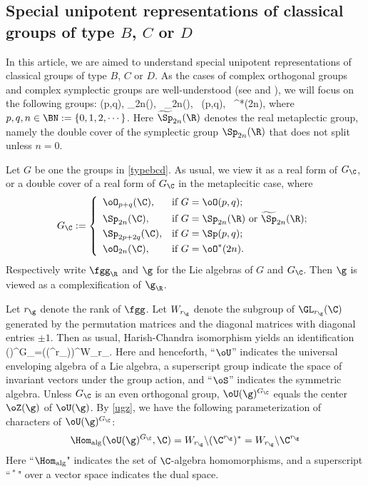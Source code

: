 \documentclass[ssunip.tex]{subfiles}
\begin{document}
\subsection{Special unipotent representations of classical groups of type $B$, $C$ or $D$}\label{secsu}
In this article, we are aimed to understand special unipotent representations of classical groups of type $B$, $C$ or $D$. As the cases of complex orthogonal groups  and complex symplectic groups are well-understood (see
\cite{BVUni} and \cite{B17}), we will focus on the following groups:
\be\label{typebcd}
  \oO(p,q), \Sp_{2n}(\R), \  \widetilde \Sp_{2n}(\R), \ \Sp(p,q), \  \oO^*(2n),
  \ee
  where $p,q, n\in \BN:=\{0,1,2, \cdots\}$. Here $ \widetilde \Sp_{2n}(\R)$ denotes the real metaplectic group, namely the double cover of the symplectic group  $\Sp_{2n}(\R)$ that does not split unless $n=0$.

Let $G$ be one the groups in   \eqref{typebcd}.  As usual, we view it as  a real form of $G_\C$, or a double cover of a real form of $G_\C$ in the metaplecitic case, where
\[
  G_\C:=
  \left\{
    \begin{array}{ll}
      \oO_{p+q}(\C) , & \hbox{if $G=\oO(p,q)$;} \smallskip\\
    \Sp_{2n}(\C) , & \hbox{if $G=\Sp_{2n}(\R)$ or $\widetilde \Sp_{2n}(\R)$;} \smallskip \\
  \Sp_{2p+2q}(\C) , & \hbox{if $G=\Sp(p,q)$;} \smallskip \\
 \oO_{2n}(\C) , & \hbox{if $G=\oO^*(2n)$.} \\
    \end{array}
  \right.
\]
Respectively write $\fgg_\R$ and $\g$ for the Lie algebras of $G$ and $G_\C$. Then $\g$ is viewed as a complexification of $\g_\R$.

Let $r_\g$ denote the rank of $\fgg$. Let $W_{r_\g}$ denote the subgroup of $\GL_{r_\g}(\C)$ generated
by the permutation matrices and the diagonal matrices with diagonal entries
$\pm 1$.
 Then as usual, Harish-Chandra
isomorphism yields an identification
\be\label{ugz}
  \oU(\g)^{G_\C}=\left(\oS(\C^{r_\g})\right)^{W_{r_\g}}.
\ee
Here and henceforth,  ``$\oU$'' indicates the universal enveloping algebra of a Lie algebra,  a superscript group indicate the
space of invariant vectors under the group action, and  ``$\oS$'' indicates
the symmetric algebra. Unless $G_\C$ is an even orthogonal group,
$\oU(\g)^{G_\C}$ equals the center $\oZ(\g)$ of $\oU(\g)$.
By \eqref{ugz}, we have the following parameterization of  characters of $\oU(\g)^{G_\C}$:
\[
  \Hom_{\mathrm{alg}}(\oU(\g)^{G_\C}, \C)=W_{r_\g} \backslash (\C^{r_\g})^*= W_{r_\g}\backslash \C^{r_\g}
\]
Here ``$ \Hom_{\mathrm{alg}}$" indicates the set of $\C$-algebra homomorphisms, and a superscript ``$\,^*\,$" over a vector space indicates the dual space.
\end{document}
